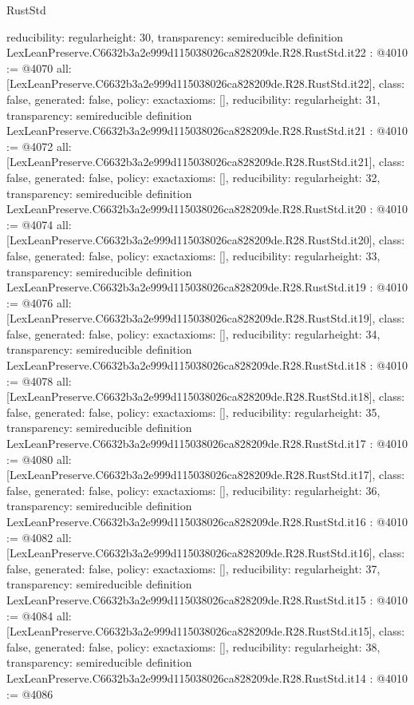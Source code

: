\begin{lexlean}{RustStd}
\begin{coremodule}
{  reducibility: regular{height: 30},
  transparency: semireducible
}
definition LexLeanPreserve.C6632b3a2e999d115038026ca828209de.R28.RustStd.it22 : @4010 := @4070 {
  all: [LexLeanPreserve.C6632b3a2e999d115038026ca828209de.R28.RustStd.it22],
  class: false,
  generated: false,
  policy: exact{axioms: []},
  reducibility: regular{height: 31},
  transparency: semireducible
}
definition LexLeanPreserve.C6632b3a2e999d115038026ca828209de.R28.RustStd.it21 : @4010 := @4072 {
  all: [LexLeanPreserve.C6632b3a2e999d115038026ca828209de.R28.RustStd.it21],
  class: false,
  generated: false,
  policy: exact{axioms: []},
  reducibility: regular{height: 32},
  transparency: semireducible
}
definition LexLeanPreserve.C6632b3a2e999d115038026ca828209de.R28.RustStd.it20 : @4010 := @4074 {
  all: [LexLeanPreserve.C6632b3a2e999d115038026ca828209de.R28.RustStd.it20],
  class: false,
  generated: false,
  policy: exact{axioms: []},
  reducibility: regular{height: 33},
  transparency: semireducible
}
definition LexLeanPreserve.C6632b3a2e999d115038026ca828209de.R28.RustStd.it19 : @4010 := @4076 {
  all: [LexLeanPreserve.C6632b3a2e999d115038026ca828209de.R28.RustStd.it19],
  class: false,
  generated: false,
  policy: exact{axioms: []},
  reducibility: regular{height: 34},
  transparency: semireducible
}
definition LexLeanPreserve.C6632b3a2e999d115038026ca828209de.R28.RustStd.it18 : @4010 := @4078 {
  all: [LexLeanPreserve.C6632b3a2e999d115038026ca828209de.R28.RustStd.it18],
  class: false,
  generated: false,
  policy: exact{axioms: []},
  reducibility: regular{height: 35},
  transparency: semireducible
}
definition LexLeanPreserve.C6632b3a2e999d115038026ca828209de.R28.RustStd.it17 : @4010 := @4080 {
  all: [LexLeanPreserve.C6632b3a2e999d115038026ca828209de.R28.RustStd.it17],
  class: false,
  generated: false,
  policy: exact{axioms: []},
  reducibility: regular{height: 36},
  transparency: semireducible
}
definition LexLeanPreserve.C6632b3a2e999d115038026ca828209de.R28.RustStd.it16 : @4010 := @4082 {
  all: [LexLeanPreserve.C6632b3a2e999d115038026ca828209de.R28.RustStd.it16],
  class: false,
  generated: false,
  policy: exact{axioms: []},
  reducibility: regular{height: 37},
  transparency: semireducible
}
definition LexLeanPreserve.C6632b3a2e999d115038026ca828209de.R28.RustStd.it15 : @4010 := @4084 {
  all: [LexLeanPreserve.C6632b3a2e999d115038026ca828209de.R28.RustStd.it15],
  class: false,
  generated: false,
  policy: exact{axioms: []},
  reducibility: regular{height: 38},
  transparency: semireducible
}
definition LexLeanPreserve.C6632b3a2e999d115038026ca828209de.R28.RustStd.it14 : @4010 := @4086 {
}
\end{coremodule}
\end{lexlean}
